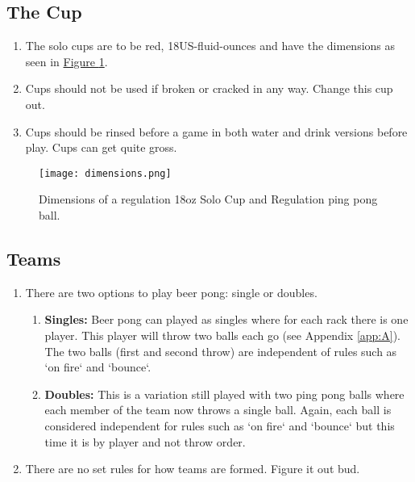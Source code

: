 	\subsection{The Cup}\label{ssec:Cup}
        \begin{enumerate}[label=(\roman*)]
            \item \label{sssec:Cup,dim} The solo cups are to be red, 18US-fluid-ounces and have the dimensions as seen in \hyperref[fig:solocup]{Figure \ref{fig:solocup}}. 
            \item \label{sssec:Cup,broken} Cups should not be used if broken or cracked in any way. Change this cup out. 
            \item \label{ssec:Cup,rinsing} Cups should be rinsed before a game in both water and drink versions before play. Cups can get quite gross. 
        \end{enumerate}
        \begin{figure}[H]
            \centering
            \texttt{[image: dimensions.png]}
            \caption{Dimensions of a regulation 18oz Solo Cup and Regulation ping pong ball.}
            \label{fig:solocup}
        \end{figure}
	\subsection{Teams}\label{ssec:Teams}
		\begin{enumerate}[label=(\roman*)]
            \item \label{sssec:teams,options} There are two options to play beer pong: single or doubles. 
                \begin{enumerate}[label=(\alph*), leftmargin=2cm]%
                    \item \textbf{Singles:} Beer pong can played as singles where for each rack there is one player.
                        This player will throw two balls each go (see Appendix \ref{app:A}).
                        The two balls (first and second throw) are independent of rules such as `on fire` and `bounce`.
                    \item \textbf{Doubles:}	This is a variation still played with two ping pong balls where each member of the team now throws a single ball.
                        Again, each ball is considered independent for rules such as `on fire` and `bounce` but this time it is by player and not throw order.
                \end{enumerate} 
            \item \label{sssec:teams,choosing} There are no set rules for how teams are formed. Figure it out bud. 
        \end{enumerate}
